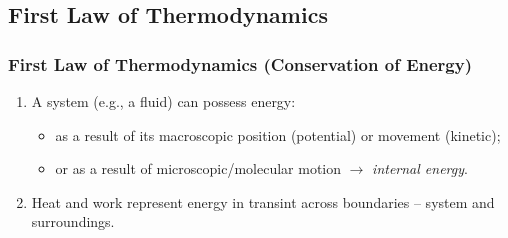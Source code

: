 \documentclass[10pt,compress]{beamer}
\begin{document}
\subsection{First Law of Thermodynamics}
\begin{frame}
 \frametitle{First Law of Thermodynamics (Conservation of Energy)}
   \begin{enumerate}
      \item<1-> A system (e.g., a fluid) can possess energy:
        \begin{itemize}
          \item<1-> as a result of its macroscopic position (potential) or movement (kinetic);
          \item<1-> or as a result of microscopic/molecular motion $\rightarrow$ {\it internal energy}.
        \end{itemize}

      \item<3-> Heat and work represent energy in transint across boundaries -- system and surroundings.

   \end{enumerate}
\normalsize
\end{frame}



\end{document}
